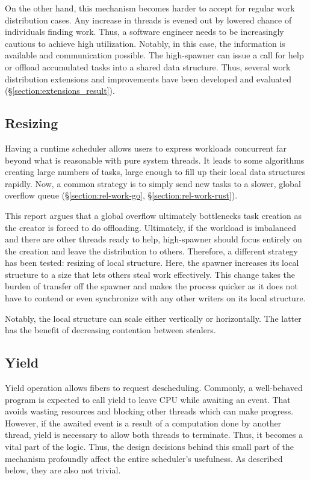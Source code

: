 \documentclass[12pt,a4paper,twoside]{report}
\begin{document}
On the other hand, this mechanism becomes harder to accept for regular work distribution cases. Any increase in threads is evened out by lowered chance of individuals finding work. Thus, a software engineer needs to be increasingly cautious to achieve high utilization. Notably, in this case, the information is available and communication possible. The high-spawner can issue a call for help or offload accumulated tasks into a shared data structure. Thus, several work distribution extensions and improvements have been developed and evaluated (\S\ref{section:extensions_result}).

\subsection{Resizing}
\label{section:resizing}

Having a runtime scheduler allows users to express workloads concurrent far beyond what is reasonable with pure system threads. It leads to some algorithms creating large numbers of tasks, large enough to fill up their local data structures rapidly. Now, a common strategy is to simply send new tasks to a slower, global overflow queue (\S\ref{section:rel-work-go}, \S\ref{section:rel-work-rust}).

This report argues that a global overflow ultimately bottlenecks task creation as the creator is forced to do offloading. Ultimately, if the workload is imbalanced and there are other threads ready to help, high-spawner should focus entirely on the creation and leave the distribution to others. Therefore, a different strategy has been tested: resizing of local structure. Here, the spawner increases its local structure to a size that lets others steal work effectively. This change takes the burden of transfer off the spawner and makes the process quicker as it does not have to contend or even synchronize with any other writers on its local structure. 

Notably, the local structure can scale either vertically or horizontally. The latter has the benefit of decreasing contention between stealers.  

\subsection{Yield}
\label{section:yield}

Yield operation allows fibers to request descheduling. Commonly, a well-behaved program is expected to call yield to leave CPU while awaiting an event. That avoids wasting resources and blocking other threads which can make progress. However, if the awaited event is a result of a computation done by another thread, yield is necessary to allow both threads to terminate. Thus, it becomes a vital part of the logic. Thus, the design decisions behind this small part of the mechanism profoundly affect the entire scheduler's usefulness. As described below, they are also not trivial.
\end{document}
